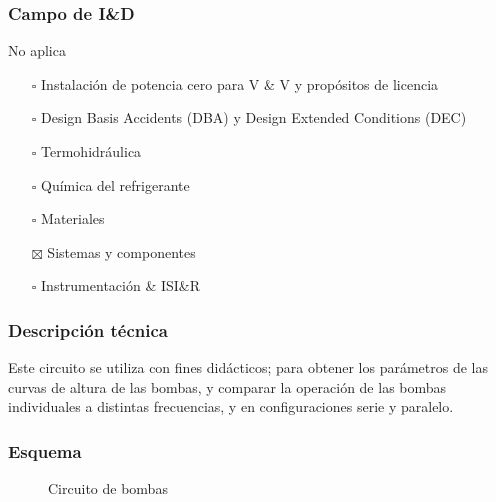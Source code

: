 \documentclass{article}
\begin{document}
\subsubsection*{Campo de I\&D}
No aplica
\begin{itemize}
\item[$\square$] Instalación de potencia cero para V \& V y propósitos de licencia
\item[$\square$] Design Basis Accidents (DBA) y Design Extended Conditions (DEC)
\item[$\square$] Termohidráulica
\item[$\square$] Química del refrigerante
\item[$\square$] Materiales
\item[$\boxtimes$] Sistemas y componentes
\item[$\square$] Instrumentación \& ISI\&R
\end{itemize}
\subsubsection*{Descripción técnica}
Este circuito se utiliza con fines didácticos; para obtener los parámetros de las curvas de altura de las bombas, y comparar la operación de las bombas individuales a distintas frecuencias, y en configuraciones serie y paralelo.
\subsubsection*{Esquema}
\begin{figure}[H]
\begin{center}
\end{center}
\caption{Circuito de bombas}
\end{figure}
\end{document}
